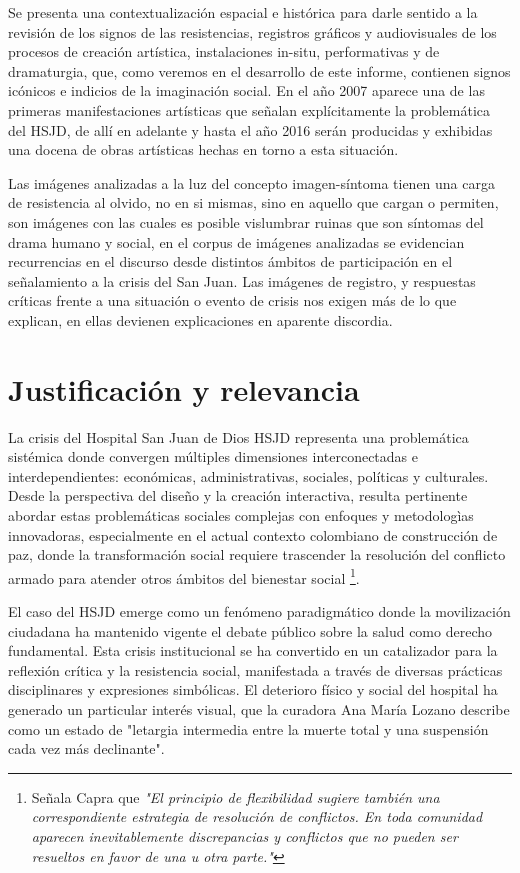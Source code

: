 Se presenta una contextualización espacial e histórica para darle sentido a la revisión de los signos de las resistencias, registros gráficos y audiovisuales de los procesos de creación artística, instalaciones in-situ, performativas y de dramaturgia, que, como veremos en el desarrollo de este informe, contienen signos icónicos e indicios de la imaginación social. En el año 2007 aparece una de las primeras manifestaciones artísticas que señalan explícitamente la problemática del HSJD, de allí en adelante y hasta el año 2016 serán producidas y exhibidas una docena de obras artísticas hechas en torno a esta situación.

Las imágenes analizadas a la luz del concepto imagen-síntoma tienen una carga de resistencia al olvido, no en si mismas, sino en aquello que cargan o permiten, son imágenes con las cuales es posible vislumbrar ruinas que son síntomas del drama humano y social, en el corpus de imágenes analizadas se evidencian recurrencias en el discurso desde distintos ámbitos de participación en el señalamiento a la crisis del San Juan. Las imágenes de registro, y respuestas críticas frente a una situación o evento de crisis nos exigen más de lo que explican, en ellas devienen explicaciones en aparente discordia.


\section*{Justificación y relevancia}
La crisis del Hospital San Juan de Dios HSJD representa una problemática sistémica donde convergen múltiples dimensiones interconectadas e interdependientes: económicas, administrativas, sociales, políticas y culturales. Desde la perspectiva del diseño y la creación interactiva, resulta pertinente abordar estas problemáticas sociales complejas con enfoques y metodologìas innovadoras, especialmente en el actual contexto colombiano de construcción de paz, donde la transformación social requiere trascender la resolución del conflicto armado para atender otros ámbitos del bienestar social \parencite[p. 313]{Capra1998}\footnote{Señala Capra que \textit{"El principio de flexibilidad sugiere también una correspondiente estrategia de resolución de conflictos. En toda comunidad aparecen inevitablemente discrepancias y conflictos que no pueden ser resueltos en favor de una u otra parte."}}.

El caso del HSJD emerge como un fenómeno paradigmático donde la movilización ciudadana ha mantenido vigente el debate público sobre la salud como derecho fundamental. Esta crisis institucional se ha convertido en un catalizador para la reflexión crítica y la resistencia social, manifestada a través de diversas prácticas disciplinares y expresiones simbólicas. El deterioro físico y social del hospital ha generado un particular interés visual, que la curadora Ana María Lozano describe como un estado de "letargia intermedia entre la muerte total y una suspensión cada vez más declinante".

